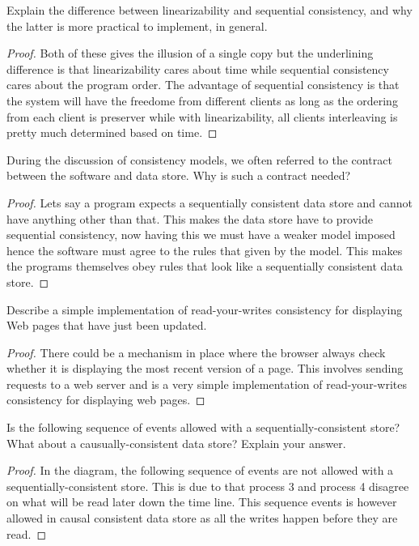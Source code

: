 \documentclass[12pt]{article}
\newenvironment{exercise}[2][Exercise]{\begin{trivlist}
\item[\hskip \labelsep {\bfseries #1}\hskip \labelsep {\bfseries #2.}]}{\end{trivlist}}
\begin{document}
\begin{exercise}{11}
Explain the difference between linearizability and sequential consistency, and why the latter is more practical to implement, in general.
\end{exercise}
 
\begin{proof}
Both of these gives the illusion of a single copy but the underlining difference is that linearizability cares about time while sequential consistency cares about the program order. The advantage of sequential consistency is that the system will have the freedome from different clients as long as the ordering from each client is preserver while with linearizability, all clients interleaving is pretty much determined based on time. 
\end{proof}
 
\begin{exercise}{12}
During the discussion of consistency models, we often referred to the contract between the software and data store. Why is such a contract needed?
\end{exercise}

\begin{proof}
Lets say a program expects a sequentially consistent data store and cannot have anything other than that. This makes the data store have to provide sequential consistency, now having this we must have a weaker model imposed hence the software must agree to the rules that given by the model. This makes the programs themselves obey rules that look like a sequentially consistent data store. 
\end{proof}

\begin{exercise}{13}
Describe a simple implementation of read-your-writes consistency for displaying Web pages that have just been updated.
\end{exercise}

\begin{proof}
There could be a mechanism in place where the browser always check whether it is displaying the most recent version of a page. This involves sending requests to a web server and is a very simple implementation of read-your-writes consistency for displaying web pages. 
\end{proof}

\begin{exercise}{14}
Is the following sequence of events allowed with a sequentially-consistent store? What about a causually-consistent data store? Explain your answer.
\end{exercise}

\begin{proof}
In the diagram, the following sequence of events are not allowed with a sequentially-consistent store. This is due to that process 3 and process 4 disagree on what will be read later down the time line. This sequence events is however allowed in causal consistent data store as all the writes happen before they are read. 
\end{proof}
\end{document}
